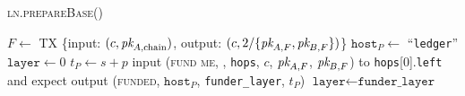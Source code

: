 \begin{center}
  \begin{processbox}{\textsc{ln.prepareBase}()}
    \ \\
    \begin{algorithmic}[1]
       
        \State $F \gets$ TX \{input: $(c, \textit{pk}_{A, \mathrm{chain}})$, output: $(c,
        2/\{\textit{pk}_{A, F}, \textit{pk}_{B, F}\})$\}
        \label{code:ln:base:create-funding}
        \State $\texttt{host}_P \gets$ ``\texttt{ledger}''
        \State $\texttt{layer} \gets 0$
        \State $t_P \gets s + p$
      \Else \: 
        \State input (\textsc{fund me}, \bob, \texttt{hops}, $c$, $\textit{pk}_{A, F}$,
        $\textit{pk}_{B, F}$) to \texttt{hops}[0].\texttt{left} and expect output
        (\textsc{funded}, $\texttt{host}_P$, \texttt{funder\_layer}, $t_P$)
        \label{code:ln:prepare-base:fund-me}
        \State $\texttt{layer} \gets \texttt{funder\_layer}$
      \EndIf
    \end{algorithmic}
  \end{processbox}
  \label{code:ln:prepare-base}
\end{center} \ \\


